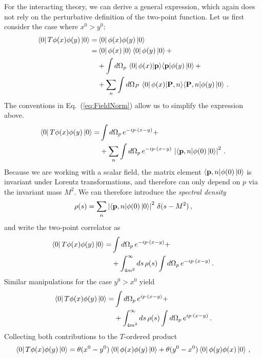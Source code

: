 \documentclass[notes]{subfiles}
\begin{document}
For the interacting theory, we can derive a general expression, which
again does not rely on the perturbative definition of the two-point
function. Let us first consider the case where $x^0>y^0$:
\begin{align}
  \bra{0} T \phi(x) \phi(y) \ket{0}
  =& \bra{0} \phi(x) \phi(y) \ket{0} \nonumber \\
  =& \bra{0} \phi(x) \ket{0} \bra{0} \phi(y) \ket{0} +
     \nonumber \\
  &+ \int d\Omega_p\, \bra{0} \phi(x)| \mathbf{p}\rangle
    \langle \mathbf{p} | \phi(y) \ket{0} + \nonumber \\
  &+ \sum_n \int d\Omega_P\, \bra{0} \phi(x) |\mathbf{P}, n\rangle
    \langle \mathbf{P}, n |\phi(y) \ket{0}\, .
\end{align}
The conventions in Eq.~(\ref{eq:FieldNorm}) allow us to simplify the
expression above.
\begin{align}
  \bra{0} T \phi(x) \phi(y) \ket{0}
  =& \int d\Omega_p\, e^{-ip\cdot (x-y)} + \nonumber \\
   &+ \sum_n \int d\Omega_p\, e^{-ip\cdot (x-y)}\, \left|
    \langle \mathbf{p}, n |\phi(0) \ket{0} \right|^2 \, .
\end{align}
Because we are working with a scalar field, the matrix element
$\langle \mathbf{p}, n |\phi(0) \ket{0}$ is invariant under Lorentz
transformations, and therefore can only depend on $p$ via the
invariant mass $M^2$. We can therefore introduce the \emph{spectral
  density}
\begin{align}
  \label{eq:SpecDen}
  \rho(s) = \sum_n \left|
    \langle \mathbf{p}, n |\phi(0) \ket{0} \right|^2 \, 
  \delta(s-M^2)\, ,
\end{align}
and write the two-point correlator as
\begin{align}
  \bra{0} T \phi(x) \phi(y) \ket{0}
  =& \int d\Omega_p\, e^{-ip\cdot (x-y)} + \nonumber \\
   &+ \int_{4m^2}^\infty ds\, \rho(s) \int d\Omega_p\,  e^{-ip\cdot
     (x-y)}\, .
\end{align}
Similar manipulations for the case $y^0>x^0$ yield
\begin{align}
  \bra{0} T \phi(x) \phi(y) \ket{0}
  =& \int d\Omega_p\, e^{ip\cdot (x-y)} + \nonumber \\
   &+ \int_{4m^2}^\infty ds\, \rho(s) \int d\Omega_p\,  e^{ip\cdot
     (x-y)}\, .
\end{align}
Collecting both contributions to the $T$-ordered product 
\begin{align}
  \bra{0} T \phi(x) \phi(y) \ket{0}
  = \theta(x^0-y^0)  \bra{0} \phi(x) \phi(y) \ket{0}
  + \theta(y^0-x^0)  \bra{0} \phi(y) \phi(x) \ket{0}\, ,
\end{align}
\end{document}
